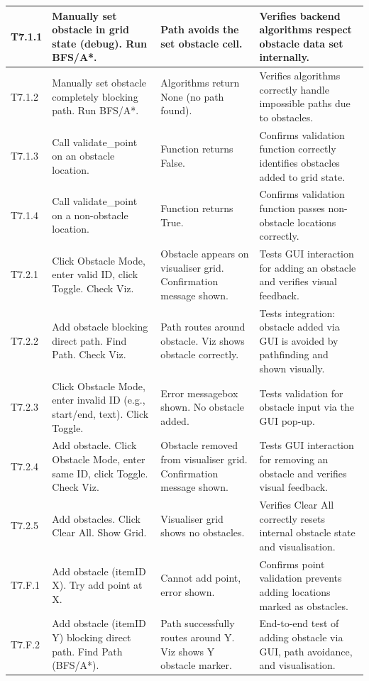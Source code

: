 \begin{longtable}{|p{}|p{}|p{}|p{}|}
	T7.1.1 & Manually set obstacle in grid state (debug). Run BFS/A*. & Path avoids the set obstacle cell. & Verifies backend algorithms respect obstacle data set internally. \\
	\hline
	T7.1.2 & Manually set obstacle completely blocking path. Run BFS/A*. & Algorithms return None (no path found). & Verifies algorithms correctly handle impossible paths due to obstacles. \\
	\hline
	T7.1.3 & Call validate\_point on an obstacle location. & Function returns False. & Confirms validation function correctly identifies obstacles added to grid state. \\
	\hline
	T7.1.4 & Call validate\_point on a non-obstacle location. & Function returns True. & Confirms validation function passes non-obstacle locations correctly. \\
	\hline
	T7.2.1 & Click Obstacle Mode, enter valid ID, click Toggle. Check Viz. & Obstacle appears on visualiser grid. Confirmation message shown. & Tests GUI interaction for adding an obstacle and verifies visual feedback. \\
	\hline
	T7.2.2 & Add obstacle blocking direct path. Find Path. Check Viz. & Path routes around obstacle. Viz shows obstacle correctly. & Tests integration: obstacle added via GUI is avoided by pathfinding and shown visually. \\
	\hline
	T7.2.3 & Click Obstacle Mode, enter invalid ID (e.g., start/end, text). Click Toggle. & Error messagebox shown. No obstacle added. & Tests validation for obstacle input via the GUI pop-up. \\
	\hline
	T7.2.4 & Add obstacle. Click Obstacle Mode, enter same ID, click Toggle. Check Viz. & Obstacle removed from visualiser grid. Confirmation message shown. & Tests GUI interaction for removing an obstacle and verifies visual feedback. \\
	\hline
	T7.2.5 & Add obstacles. Click Clear All. Show Grid. & Visualiser grid shows no obstacles. & Verifies Clear All correctly resets internal obstacle state and visualisation. \\
	\hline
	T7.F.1 & Add obstacle (itemID X). Try add point at X. & Cannot add point, error shown. & Confirms point validation prevents adding locations marked as obstacles. \\
	\hline
	T7.F.2 & Add obstacle (itemID Y) blocking direct path. Find Path (BFS/A*). & Path successfully routes around Y. Viz shows Y obstacle marker. & End-to-end test of adding obstacle via GUI, path avoidance, and visualisation. \\

\end{longtable}
